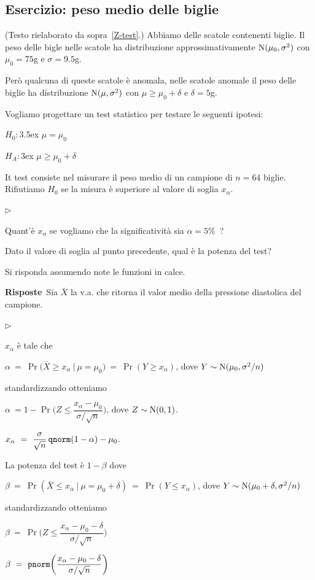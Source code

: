 \documentclass[11pt,openany]{book}
\newcommand{\mylabel}[1]{{\footnotesize\textsf{#1}}\hfill}
\renewenvironment{itemize}
  {\begin{list}{$\triangleright$}{%
   \setlength{\parskip}{0mm}
   \setlength{\topsep}{.2\baselineskip}
   \setlength{\rightmargin}{0mm}
   \setlength{\listparindent}{0mm}
   \setlength{\itemindent}{0mm}
   \setlength{\labelwidth}{3ex}
   \setlength{\itemsep}{.4\baselineskip}
   \setlength{\parsep}{0mm}
   \setlength{\partopsep}{0mm}
   \setlength{\labelsep}{1ex}
   \setlength{\leftmargin}{\labelwidth+\labelsep}
   \let\makelabel\mylabel}}{%
   \end{list}\vspace*{-1.3mm}}
\begin{document}
\clearpage\subsection{Esercizio: peso medio delle biglie}
\label{Peso medio delle biglie: esercizio 1}

(Testo rielaborato da sopra~\ref{Z-test}.) 
Abbiamo delle scatole contenenti biglie.
Il peso delle bigle nelle scatole ha distribuzione approssimativamente  ${\rm N}(\mu_0,\sigma^2)$ con $\mu_0=75$g e $\sigma=9.5$g. 

Però qualcuna di queste scatole è anomala, nelle scatole anomale il peso delle biglie ha distribuzione  ${\rm N}(\mu,\sigma^2)$ con $\mu\ge\mu_0+\delta$ e $\delta=5$g.

Vogliamo progettare un test statistico per testare le seguenti ipotesi:

$H_0:$\kern3.5ex $\mu=\mu_0$

$H_A:$\kern3ex $\mu\ge\mu_0+\delta$

It test consiste nel misurare il peso medio di un campione di $n=64$ biglie.
Rifiutiamo $H_0$ se la misura è superiore al valore di soglia $x_\alpha$. 

\begin{itemize}
\item[1.] Quant'è $x_\alpha$ se vogliamo che la significatività sia  $\alpha=5\%$~?

\item[2.] Dato il valore di soglia al punto precedente, qual è la potenza del test? 
\end{itemize}

Si risponda assumendo note le funzioni in calce.

\textbf{Risposte}\ 
 Sia $\bar X$ la v.a. che ritorna il valor medio della pressione diastolica del campione.


\begin{itemize}
  \item[1.] $x_\alpha$ è tale che \medskip

  $\alpha\ =\ \Pr\big(\bar X\ge x_\alpha\ \mathbin\big|\ \mu=\mu_0\big)\ =\ \Pr(Y\ge x_\alpha)$, dove $Y\sim {\rm N}(\mu_0,\sigma^2/n)$ \medskip

  standardizzando otteniamo \medskip

$\alpha\ = 1-\Pr\bigg(Z\le \dfrac{x_\alpha-\mu_0}{\sigma/\sqrt n}\bigg)$, dove $Z\sim {\rm N}(0,1)$.

\hfill $x_\alpha\ =\ \dfrac{\sigma}{\sqrt n}\,{\tt qnorm}(1-\alpha)-\mu_0$.

\item[2.] La potenza del test è $1-\beta$ dove\medskip

$\beta\ =\ \Pr(\bar X\le x_\alpha\ |\ \mu=\mu_0+\delta)\ =\ \Pr(Y\le x_\alpha)$, dove $Y\sim {\rm N}(\mu_0+\delta,\sigma^2/n)$\medskip

standardizzando otteniamo \medskip

$\beta\ =\ \Pr\bigg(Z\le  \dfrac{x_\alpha-\mu_0-\delta}{\sigma/\sqrt n}\bigg)$

\hfill$\beta\ =\  {\tt pnorm}\bigg(\dfrac{x_\alpha-\mu_0-\delta}{\sigma/\sqrt n}\bigg)$

\end{itemize}
\end{document}
